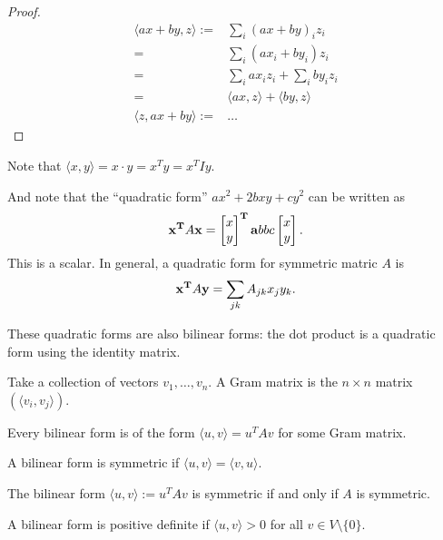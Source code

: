 \begin{proof}
  \begin{align*}
    \langle ax + by , z \rangle :=& \sum_i (ax + by)_iz_i\\
                                 =& \sum_i (ax_i + by_i)z_i\\
                                 =& \sum_i ax_iz_i + \sum_i by_iz_i\\
                                 =& \langle ax, z \rangle + \langle by, z \rangle\\
    \langle z, ax + by \rangle  :=& \ldots
  \end{align*}
\end{proof}

Note that $\langle x, y \rangle = x \cdot y = x^Ty = x^TIy$.

And note that the ``quadratic form'' $ax^2 + 2bxy + cy^2$ can be written as
\begin{align*}
\mathbf x^{\mathbf{T}} A \mathbf x = \begin{bmatrix}x\\y\end{bmatrix}^{\mathbf{T}} \mathbf{a}{b}
                                {b}{c} \begin{bmatrix}x\\y\end{bmatrix}.
\end{align*}
This is a scalar. In general, a quadratic form for symmetric matric $A$ is
\begin{align*}
\mathbf x^{\mathbf{T}} A \mathbf y = \sum_{jk}A_{jk}x_jy_k.
\end{align*}

These quadratic forms are also bilinear forms: the dot product is a quadratic form using the
identity matrix.

\begin{definition*}
  Take a collection of vectors $v_1, \ldots, v_n$. A Gram matrix is the $n \times n$ matrix
  $(\langle v_i, v_j \rangle)$.
\end{definition*}

\begin{theorem*}
  Every bilinear form is of the form $\langle u, v \rangle = u^TAv$ for some Gram matrix.
\end{theorem*}

\begin{definition*}
  A bilinear form is symmetric if $\langle u, v \rangle = \langle v, u \rangle$.
\end{definition*}

\begin{theorem*}
  The bilinear form $\langle u, v \rangle := u^TAv$ is symmetric if and only if $A$ is symmetric.
\end{theorem*}

\begin{definition*}
  A bilinear form is positive definite if $\langle u, v \rangle > 0$ for all
  $v \in V \setminus \{0\}$.
\end{definition*}

